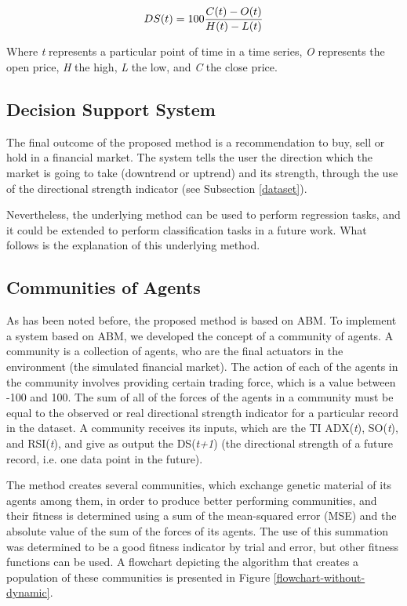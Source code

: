 \documentclass[a4paper,twoside]{article}
\begin{document}
\begin{equation} \label{directional-strength}
  DS(t) = 100{{C(t) - O(t)} \over {H(t) - L(t)}}
\end{equation}

Where \textit{t} represents a particular point of time in a time series, \textit{O} represents the open price, \textit{H} the high, \textit{L} the low, and \textit{C} the close price.

\subsection{Decision Support System}

The final outcome of the proposed method is a recommendation to buy, sell or hold in a financial market. The system tells the user the direction which the market is going to take (downtrend or uptrend) and its strength, through the use of the directional strength indicator (see Subsection \ref{dataset}).

Nevertheless, the underlying method can be used to perform regression tasks, and it could be extended to perform classification tasks in a future work. What follows is the explanation of this underlying method.

\subsection{Communities of Agents}
\label{communities-of-agents}

As has been noted before, the proposed method is based on ABM. To implement a system based on ABM, we developed the concept of a community of agents. A community is a collection of agents, who are the final actuators in the environment (the simulated financial market). The action of each of the agents in the community involves providing certain trading force, which is a value between -100 and 100. The sum of all of the forces of the agents in a community must be equal to the observed or real directional strength indicator for a particular record in the dataset. A community receives its inputs, which are the TI ADX(\textit{t}), SO(\textit{t}), and RSI(\textit{t}), and give as output the DS(\textit{t+1}) (the directional strength of a future record, i.e. one data point in the future).

The method creates several communities, which exchange genetic material of its agents among them, in order to produce better performing communities, and their fitness is determined using a sum of the mean-squared error (MSE) and the absolute value of the sum of the forces of its agents. The use of this summation was determined to be a good fitness indicator by trial and error, but other fitness functions can be used. A flowchart depicting the algorithm that creates a population of these communities is presented in Figure \ref{flowchart-without-dynamic}.
\end{document}
